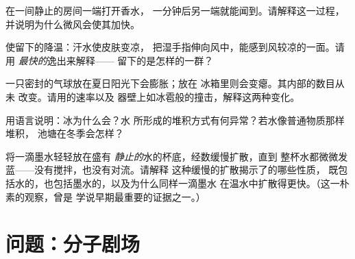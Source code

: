 \begin{exercise}[$\star$]\label{exo:g7:states-of-matter:8}
在一间静止的房间一端打开香水，
一分钟后另一端就能闻到。请解释这一过程，
并说明为什么微风会使其加快。
\end{exercise}

\begin{exercise}[$\star\star$]\label{exo:g7:states-of-matter:9}
使留下的降温：汗水使皮肤变凉，
把湿手指伸向风中，能感到风较凉的一面。请用
\emph{最快的}逸出来解释——
留下的是怎样的一群？
\end{exercise}

\begin{exercise}[$\star\star$]\label{exo:g7:states-of-matter:10}
一只密封的气球放在夏日阳光下会膨胀；放在
冰箱里则会变瘪。其内部的数目从未
改变。请用的速率以及
器壁上如冰雹般的撞击，解释这两种变化。
\end{exercise}

\begin{exercise}[$\star\star$]\label{exo:g7:states-of-matter:11}
用语言说明：冰为什么会？水
所形成的堆积方式有何异常？若水像普通物质那样堆积，
池塘在冬季会怎样？
\end{exercise}

\begin{exercise}[$\star\star\star$]\label{exo:g7:states-of-matter:12}
将一滴墨水轻轻放在盛有
\emph{静止的}水的杯底，经数缓慢扩散，直到
整杯水都微微发蓝——没有搅拌，也没有对流。请解释
这种缓慢的扩散揭示了的哪些性质，
既包括水的，也包括墨水的，以及为什么同样一滴墨水
在温水中扩散得更快。（这一朴素的观察，曾是
学说早期最重要的证据之一。）
\end{exercise}

\section{问题：分子剧场}

